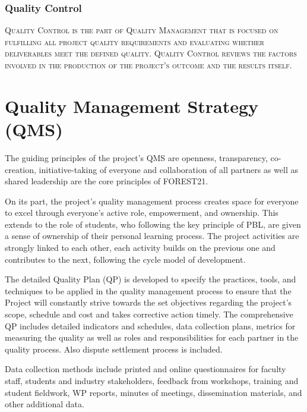 \documentclass[
  11pt,
]{article}
\begin{document}
\hypertarget{quality-control}{%
\subsubsection{Quality Control}\label{quality-control}}

\begin{tcolorbox}

\textsc{Quality Control is the part of Quality Management that is focused on fulfilling all project quality requirements and evaluating whether deliverables meet the defined quality. Quality Control reviews the factors involved in the production of the project's outcome and the results itself.}

\end{tcolorbox}

\clearpage

\hypertarget{quality-management-strategy-qms}{%
\section{Quality Management Strategy
(QMS)}\label{quality-management-strategy-qms}}

The guiding principles of the project's QMS are openness, transparency,
co-creation, initiative-taking of everyone and collaboration of all
partners as well as shared leadership are the core principles of
FOREST21.

On its part, the project's quality management process creates space for
everyone to excel through everyone's active role, empowerment, and
ownership. This extends to the role of students, who following the key
principle of PBL, are given a sense of ownership of their personal
learning process. The project activities are strongly linked to each
other, each activity builds on the previous one and contributes to the
next, following the cycle model of development.

The detailed Quality Plan (QP) is developed to specify the practices,
tools, and techniques to be applied in the quality management process to
ensure that the Project will constantly strive towards the set
objectives regarding the project's scope, schedule and cost and takes
corrective action timely. The comprehensive QP includes detailed
indicators and schedules, data collection plans, metrics for measuring
the quality as well as roles and responsibilities for each partner in
the quality process. Also dispute settlement process is included.

Data collection methods include printed and online questionnaires for
faculty staff, students and industry stakeholders, feedback from
workshops, training and student fieldwork, WP reports, minutes of
meetings, dissemination materials, and other additional data.
\end{document}
